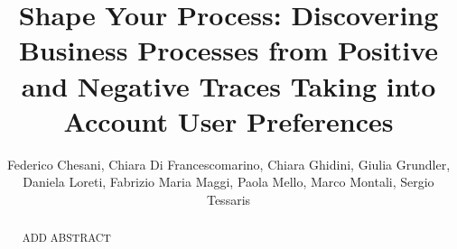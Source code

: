 \documentclass[runningheads]{llncs}
\begin{document}
%
\title{Shape Your Process: Discovering Business Processes from Positive and Negative Traces Taking into Account User Preferences}

%
%

\author{Federico Chesani, Chiara Di Francescomarino, Chiara Ghidini, Giulia Grundler, Daniela Loreti, Fabrizio Maria Maggi, Paola Mello, Marco Montali, Sergio Tessaris}

%
%
%
\maketitle              %
%
\begin{abstract}
ADD ABSTRACT
\end{abstract}
%
%
%







%









% 
%
% 
%
% 
%
% 
%
%
% 

%
%
%
 
 
%
\end{document}
